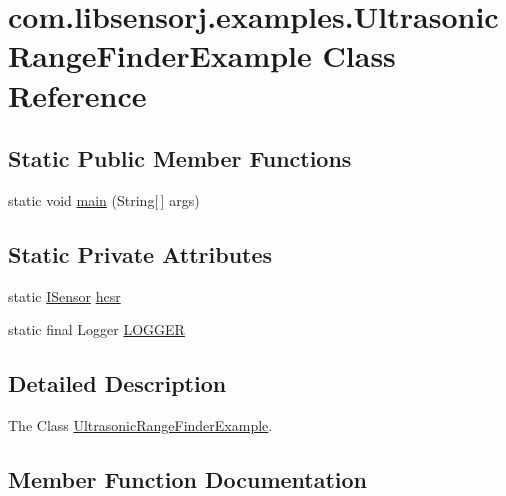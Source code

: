 \hypertarget{classcom_1_1libsensorj_1_1examples_1_1UltrasonicRangeFinderExample}{}\section{com.\+libsensorj.\+examples.\+Ultrasonic\+Range\+Finder\+Example Class Reference}
\label{classcom_1_1libsensorj_1_1examples_1_1UltrasonicRangeFinderExample}
\subsection*{Static Public Member Functions}
\begin{DoxyCompactItemize}
\item 
static void \hyperlink{classcom_1_1libsensorj_1_1examples_1_1UltrasonicRangeFinderExample_a587a298526337ce9e0d1fbbb9f400180}{main} (String\mbox{[}$\,$\mbox{]} args)
\end{DoxyCompactItemize}
\subsection*{Static Private Attributes}
\begin{DoxyCompactItemize}
\item 
static \hyperlink{interfacecom_1_1libsensorj_1_1interfaces_1_1ISensor}{I\+Sensor} \hyperlink{classcom_1_1libsensorj_1_1examples_1_1UltrasonicRangeFinderExample_af4703590c0c8bce89386204ea46afc76}{hcsr}
\item 
static final Logger \hyperlink{classcom_1_1libsensorj_1_1examples_1_1UltrasonicRangeFinderExample_ac1d433a89455addc211f404fe522f0ec}{L\+O\+G\+G\+E\+R}
\end{DoxyCompactItemize}


\subsection{Detailed Description}
The Class \hyperlink{classcom_1_1libsensorj_1_1examples_1_1UltrasonicRangeFinderExample}{Ultrasonic\+Range\+Finder\+Example}. 

\subsection{Member Function Documentation}
\hypertarget{classcom_1_1libsensorj_1_1examples_1_1UltrasonicRangeFinderExample_a587a298526337ce9e0d1fbbb9f400180}{}
